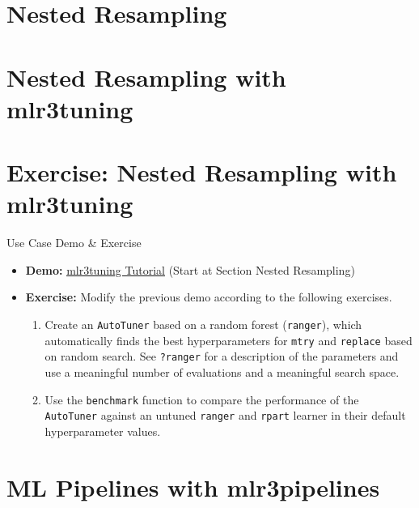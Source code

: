 \documentclass[11pt,compress]{beamer}
\begin{document}

\section{Nested Resampling}




\section{Nested Resampling with mlr3tuning}


\section{Exercise: Nested Resampling with mlr3tuning}
\begin{frame}{Use Case Demo \& Exercise}
\begin{itemize}
\item \textbf{Demo:} \href{https://mlr3gallery.mlr-org.com/posts/2020-03-11-mlr3tuning-tutorial-german-credit/\#nested-resampling}{\underline{mlr3tuning Tutorial}} (Start at Section Nested Resampling)
\item \textbf{Exercise:} Modify the previous demo according to the following exercises.
\begin{enumerate}
\item Create an \texttt{AutoTuner} based on a random forest (\texttt{ranger}), which automatically finds the best hyperparameters for \texttt{mtry} and \texttt{replace} based on random search.
See \texttt{?ranger} for a description of the parameters and use a meaningful number of evaluations and a meaningful search space.
\item Use the \texttt{benchmark} function to compare the performance of the \texttt{AutoTuner} against an untuned \texttt{ranger} and \texttt{rpart} learner in their default hyperparameter values.
\end{enumerate}
\end{itemize}
\end{frame}

\section{ML Pipelines with mlr3pipelines}

\end{document}
